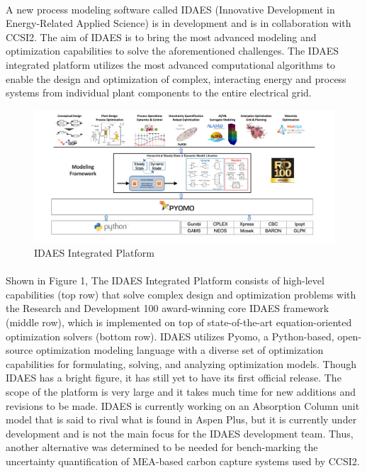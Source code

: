 \documentclass[12pt, letterpaper]{article}
\begin{document}
\paragraph{}
A new process modeling software called IDAES (Innovative Development in Energy-Related Applied Science) is in development and is in collaboration with CCSI2. The aim of IDAES is to bring the most advanced modeling and optimization capabilities to solve the aforementioned challenges. The IDAES integrated platform utilizes the most advanced computational algorithms to enable the design and optimization of complex, interacting energy and process systems from individual plant components to the entire electrical grid. 

\begin{figure}[ht]
    \centering
    \includegraphics[width=16cm]{IDAES.png}
    \caption{IDAES Integrated Platform}
\end{figure}

\paragraph{}
Shown in Figure 1, The IDAES Integrated Platform consists of high-level capabilities (top row) that solve complex design and optimization problems with the Research and Development 100 award-winning core IDAES framework (middle row), which is implemented on top of state-of-the-art equation-oriented optimization solvers (bottom row). IDAES utilizes Pyomo, a Python-based, open-source optimization modeling language with a diverse set of optimization capabilities for formulating, solving, and analyzing optimization models. Though IDAES has a bright figure, it has still yet to have its first official release. The scope of the platform is very large and it takes much time for new additions and revisions to be made. IDAES is currently working on an Absorption Column unit model that is said to rival what is found in Aspen Plus, but it is currently under development and is not the main focus for the IDAES development team. Thus, another alternative was determined to be needed for bench-marking the uncertainty quantification of MEA-based carbon capture systems used by CCSI2.
\end{document}

